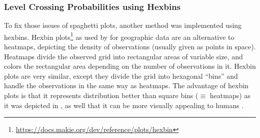 \subsubsection{Level Crossing Probabilities using Hexbins}

To fix those issues of spaghetti plots, another method was implemented using hexbins. 
Hexbin plots\footnote{\url{https://docs.makie.org/dev/reference/plots/hexbin}} as used by  for geographic data are an alternative to heatmaps, depicting the density of observations (usually given as points in space). 
Heatmaps divide the observed grid into rectangular areas of variable size, and colors the rectangular area depending on the number of observations in it. 
Hexbin plots are very similar, except they divide the grid into hexagonal \enquote{bins} and handle the observations in the same way as heatmaps. 
The advantage of hexbin plots is that it represents distribution better than square bins ($\equiv$ heatmaps) as it was depicted in \cite{carr_hexagon_1992}, as well that it can be more visually appealing to humans \cite{carr_hexagon_1992}. 


